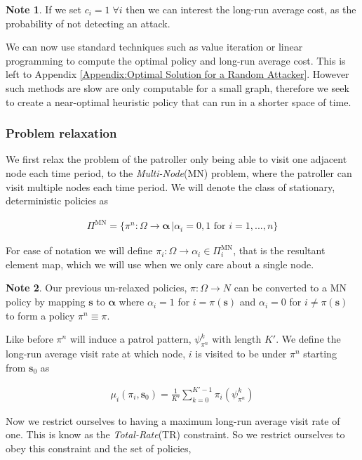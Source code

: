 \documentclass[a4paper,10pt]{article}
\theoremstyle{definition}
\theoremstyle{definition}
\theoremstyle{remark}
\theoremstyle{definition}
\newtheorem*{note}{Note}
\begin{document}
\begin{note}
If we set $c_{i}=1 \; \forall i$ then we can interest the long-run average cost, as the probability of not detecting an attack.
\end{note}

We can now use standard techniques such as value iteration or linear programming to compute the optimal policy and long-run average cost. This is left to Appendix \ref{Appendix:Optimal Solution for a Random Attacker}. However such methods are slow are only computable for a small graph, therefore we seek to create a near-optimal heuristic policy that can run in a shorter space of time.


\subsubsection{Problem relaxation}
We first relax the problem of the patroller only being able to visit one adjacent node each time period, to the \textit{Multi-Node}(MN) problem, where the patroller can visit multiple nodes each time period. We will denote the class of stationary, deterministic policies as

\begin{align*}
\Pi^{\text{MN}}=\{\pi^{n}: \Omega \rightarrow \bm{\alpha} \, | \alpha_{i}=0,1 \text{ for } i=1,...,n \}
\end{align*}

For ease of notation we will define $\pi_{i}:\Omega \rightarrow \alpha_{i} \in \Pi^{\text{MN}}_{i}$, that is the resultant element map, which we will use when we only care about a single node.

\begin{note}
Our previous un-relaxed policies, $\pi: \Omega \rightarrow N$ can be converted to a MN policy by mapping $\bm{s}$ to $\bm{\alpha}$ where $\alpha_{i}=1$ for $i=\pi(\bm{s})$ and $\alpha_{i}=0$ for $i \neq \pi(\bm{s})$ to form a policy $\pi^{n} \equiv \pi$.
\end{note}

Like before $\pi^{n}$ will induce a patrol pattern, $\psi^{k}_{\pi^{n}}$ with length $K'$. We define the long-run average visit rate at which node, $i$ is visited to be under $\pi^{n}$ starting from $\bm{s}_{0}$ as

\begin{align*}
\mu_{i}(\pi_{i},\bm{s}_{0})=\frac{1}{K'} \sum\limits_{k=0}^{K'-1} \pi_{i}(\psi^{k}_{\pi^{n}})
\end{align*}

Now we restrict ourselves to having a maximum long-run average visit rate of one. This is know as the \textit{Total-Rate}(TR) constraint. So we restrict ourselves to obey this constraint and the set of policies,
\end{document}
